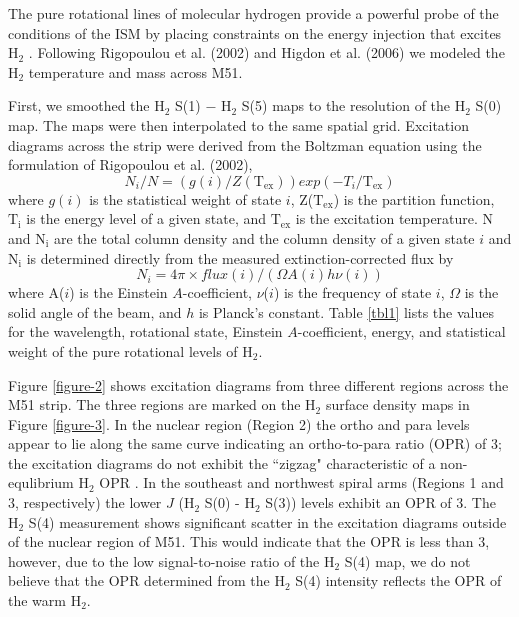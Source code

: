 \documentclass[manuscript]{aastex}
\begin{document}
The pure rotational lines of molecular hydrogen provide a powerful
probe of the conditions of the ISM by placing constraints on the
energy injection that excites $\mathrm{H_2}$ \citep{neu06}.  Following
Rigopoulou et al. (2002) and Higdon et al. (2006) we modeled 
the $\mathrm{H_2}$ temperature and mass across M51.

First, we smoothed the $\mathrm{H_2}$ S(1) $-$ $\mathrm{H_2}$ S(5)
maps to the resolution of the $\mathrm{H_2}$ S(0) map.
The maps were then interpolated to the same spatial grid.  Excitation
diagrams across the strip were derived from the Boltzman equation
using the formulation of Rigopoulou et al. (2002),
\begin{equation}
N_i/N = (g(i)/Z(\mathrm{T_{ex}}))exp(-T_i/\mathrm{T_{ex}})
\end{equation}
where $g(i)$ is the statistical weight of state $i$,
Z($\mathrm{T_{ex}}$) is the partition function, $\mathrm{T_i}$ is the
energy level of a given state, and $\mathrm{T_{ex}}$ is the excitation
temperature.  N and $\mathrm{N_i}$ are the total column density and
the column density of a given state $i$ and $\mathrm{N_i}$ is
determined directly from the measured extinction-corrected flux by
\begin{equation}
N_i = 4 \pi \times flux(i)/(\Omega A(i)h\nu (i))
\end{equation}
where A($i$) is the Einstein $A$-coefficient, $\nu$($i$) is the
frequency of state $i$, $\Omega$ is the solid angle of the beam, and
$h$ is Planck's constant.  Table \ref{tbl1} lists the values for the
wavelength, rotational state, Einstein $A$-coefficient, energy, and
statistical weight of the pure rotational levels of $\mathrm{H_2}$.

Figure \ref{figure-2} shows excitation diagrams from three
different regions across the M51 strip.  The three regions are marked on the H$_2$ surface density maps in Figure \ref{figure-3}.  In the nuclear region 
(Region 2) the ortho and para levels appear to lie along the 
same curve indicating an ortho-to-para ratio (OPR) of 3; 
the excitation diagrams do not exhibit the ``zigzag" characteristic of a 
non-equlibrium H$_2$ OPR \citep{neu98, fue99}.  In 
the southeast and northwest spiral arms (Regions 1 and 
3, respectively) the lower $J$ ($\mathrm{H_2}$ S(0) - 
$\mathrm{H_2}$ S(3)) levels exhibit an OPR of 3.  The 
$\mathrm{H_2}$ S(4) measurement shows significant 
scatter in the excitation diagrams outside of the nuclear 
region of M51.  This would indicate that the OPR is 
less than 3, however, due to the low signal-to-noise 
ratio of the $\mathrm{H_2}$ S(4) map, we do not 
believe that the OPR determined from the $\mathrm{H_2}$ 
S(4) intensity reflects the OPR of the warm $\mathrm{H_2}$.
\end{document}
